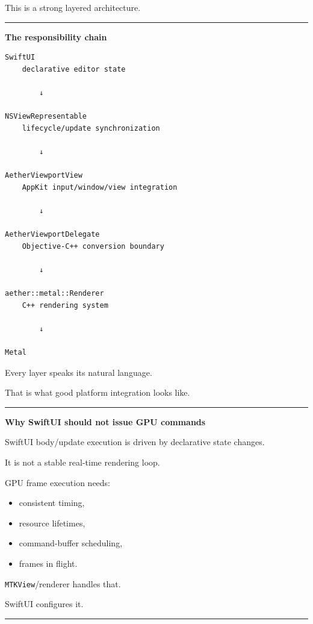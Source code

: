 This is a strong layered architecture.

\begin{center}\rule{0.5\linewidth}{0.5pt}\end{center}

\textbf{The responsibility chain}

\begin{verbatim}
SwiftUI
    declarative editor state

        ↓

NSViewRepresentable
    lifecycle/update synchronization

        ↓

AetherViewportView
    AppKit input/window/view integration

        ↓

AetherViewportDelegate
    Objective-C++ conversion boundary

        ↓

aether::metal::Renderer
    C++ rendering system

        ↓

Metal
\end{verbatim}

Every layer speaks its natural language.

That is what good platform integration looks like.

\begin{center}\rule{0.5\linewidth}{0.5pt}\end{center}

\textbf{Why SwiftUI should not issue GPU commands}

SwiftUI body/update execution is driven by declarative state changes.

It is not a stable real-time rendering loop.

GPU frame execution needs:

\begin{itemize}
\tightlist
\item
  consistent timing,
\item
  resource lifetimes,
\item
  command-buffer scheduling,
\item
  frames in flight.
\end{itemize}

\texttt{MTKView}/renderer handles that.

SwiftUI configures it.

\begin{center}\rule{0.5\linewidth}{0.5pt}\end{center}


